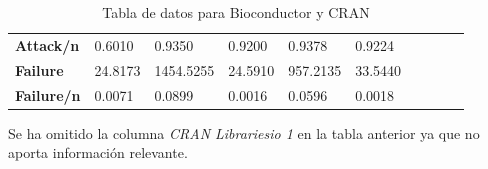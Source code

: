 \begin{table}[ht!]
\begin{tabular}{|l|l|l|l|l|l|l|l|l|l|}
        \textbf{Attack/n}      & 0.6010                & 0.9350                 & 0.9200                 & 0.9378                 & 0.9224           \\
        \textbf{Failure}       & 24.8173               & 1454.5255              & 24.5910                & 957.2135               & 33.5440          \\
        \textbf{Failure/n}     & 0.0071                & 0.0899                 & 0.0016                 & 0.0596                 & 0.0018           \\
        \hline
    \end{tabular}
    \caption{Tabla de datos para Bioconductor y CRAN}
\end{table}

Se ha omitido la columna \textit{CRAN Librariesio 1} en la tabla anterior ya que no aporta información relevante.

